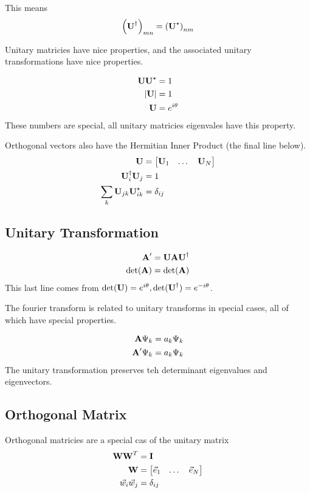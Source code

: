 \documentclass{article}
\newcommand{\be}{\begin{equation}}
\newcommand{\ee}{\end{equation}}
\newcommand{\dg}{\dagger}
\newcommand{\bA}{\mbox{\bf A}}
\newcommand{\bI}{\mbox{\bf I}}
\newcommand{\bU}{\mbox{\bf U}}
\newcommand{\bW}{\mbox{\bf W}}
\begin{document}
This means
\be
\left(\bU^\dg\right)_{mn} = \left(\bU^\star\right)_{nm}
\ee

Unitary matricies have nice properties, and the associated unitary transformations have nice properties.

\be
\begin{split}
    \bU\bU^\star &= 1\\
    |\bU| &= 1\\
    \bU &= e^{i\theta}
\end{split}
\ee
These numbers are special, all unitary matricies eigenvales have this property.

Orthogonal vectors also have the Hermitian Inner Product (the final line below).
\be
\begin{split}
    \bU &= \begin{bmatrix}
        \bU_1 & \dots  & \bU_N
\end{bmatrix}\\
    \bU^\dg_i\bU_j&=1\\
    \sum_k\bU_{jk}\bU^\star_{ik}&=\delta_{ij}
\end{split}
\ee

\subsection{Unitary Transformation}
\be
\begin{split}
\bA' &= \bU\bA\bU^\dg\\
    \det(\bA) &= \det(\bA)
\end{split}
\ee
This last line comes from $\det(\bU)=e^{i\theta}, \det(\bU^\dg) = e^{-i\theta}$.

The fourier transform is related to unitary transforms in special cases, all of which have special properties.

\be
\begin{split}
    \bA\Psi_k &= a_k\Psi_k\\
    \bA'\Psi_k &= a_k\Psi_k\\
\end{split}
\ee
The unitary transformation preserves teh determinant eigenvalues and eigenvectors.

\subsection*{Orthogonal Matrix}
Orthogonal matricies are a special cas of the unitary matrix
\be
\begin{split}
    \bW\bW^T&=\bI\\
    \bW &= \begin{bmatrix}
        \vec{e}_1 & \dots  & \vec{e}_N
\end{bmatrix}\\
    \vec{w}_i\vec{w}_j &= \delta_{ij}
\end{split}
\ee
\end{document}
